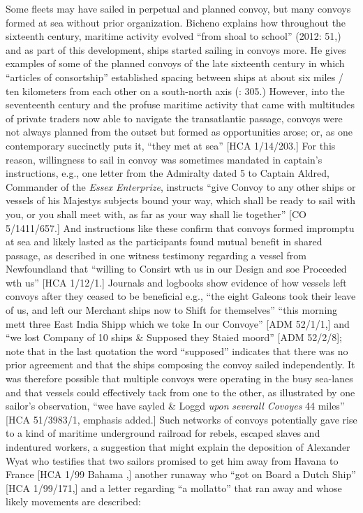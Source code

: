 Some fleets may have sailed in perpetual and planned convoy, but many convoys formed at sea without prior organization. Bicheno explains how throughout the sixteenth century, maritime activity evolved “from shoal to school” (2012: 51,) and as part of this development, ships started sailing in convoys more. He gives examples of some of the planned convoys of the late sixteenth century in which “articles of consortship” established spacing between ships at about six miles / ten kilometers from each other on a south-north axis (\citealt{Bicheno2012}: 305.) However, into the seventeenth century and the profuse maritime activity that came with multitudes of private traders now able to navigate the transatlantic passage, convoys were not always planned from the outset but formed as opportunities arose; or, as one contemporary succinctly puts it, “they met at sea” [HCA 1/14/203.] For this reason, willingness to sail in convoy was sometimes mandated in captain’s instructions, e.g., one letter from the Admiralty dated 5 \citealt{December1699} to Captain Aldred, Commander of the \textit{Essex} \textit{Enterprize}, instructs “give Convoy to any other ships or vessels of his Majestys subjects bound your way, which shall be ready to sail with you, or you shall meet with, as far as your way shall lie together” [CO 5/1411/657.] And instructions like these confirm that convoys formed impromptu at sea and likely lasted as the participants found mutual benefit in shared passage, as described in one witness testimony regarding a vessel from Newfoundland that “willing to Consirt wth us in our Design and soe Proceeded wth us” [HCA 1/12/1.] Journals and logbooks show evidence of how vessels left convoys after they ceased to be beneficial e.g., “the eight Galeons took their leave of us, and left our Merchant ships now to Shift for themselves” \citep[15,]{Gage1648} “this morning mett three East India Shipp which we toke In our Convoye” [ADM 52/1/1,] and “we lost Company of 10 ships \& Supposed they Staied moord” [ADM 52/2/8]; note that in the last quotation the word “supposed” indicates that there was no prior agreement and that the ships composing the convoy sailed independently. It was therefore possible that multiple convoys were operating in the busy sea-lanes and that vessels could effectively tack from one to the other, as illustrated by one sailor’s observation, “wee have sayled \& Loggd \textit{upon} \textit{severall} \textit{Covoyes} 44 miles” [HCA 51/3983/1, emphasis added.]  Such networks of convoys potentially gave rise to a kind of maritime underground railroad for rebels, escaped slaves and indentured workers, a suggestion that might explain the deposition of Alexander Wyat who testifies that two sailors promised to get him away from Havana to France [HCA 1/99 Bahama \citealt{Islands1722},] another runaway who “got on Board a Dutch Ship” [HCA 1/99/171,] and a letter regarding “a mollatto” that ran away and whose likely movements are described:

